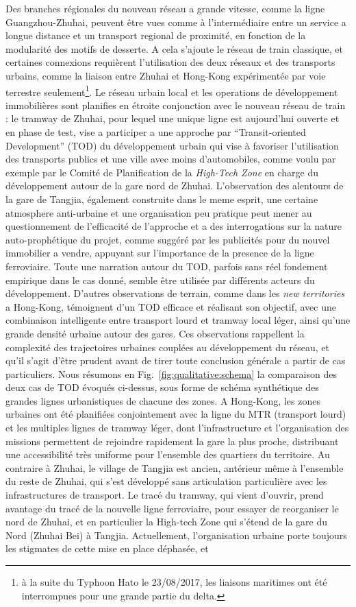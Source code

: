 {Des branches régionales du nouveau réseau a grande vitesse, comme la ligne Guangzhou-Zhuhai, peuvent être vues comme à l'intermédiaire entre un service a longue distance et un transport regional de proximité, en fonction de la modularité des motifs de desserte. A cela s'ajoute le réseau de train classique, et certaines connexions requièrent l'utilisation des deux réseaux et des transports urbains, comme la liaison entre Zhuhai et Hong-Kong expérimentée par voie terrestre seulement\footnote{à la suite du Typhoon Hato le 23/08/2017, les liaisons maritimes ont été interrompues pour une grande partie du delta.}. Le réseau urbain local et les operations de développement immobilières sont planifies en étroite conjonction avec le nouveau réseau de train : le tramway de Zhuhai, pour lequel une unique ligne est aujourd'hui ouverte et en phase de test, vise a participer a une approche par ``Transit-oriented Development'' (TOD) du développement urbain qui vise à favoriser l'utilisation des transports publics et une ville avec moins d'automobiles, comme voulu par exemple par le Comité de Planification de la \emph{High-Tech Zone} en charge du développement autour de la gare nord de Zhuhai. L'observation des alentours de la gare de Tangjia, également construite dans le meme esprit, une certaine atmosphere anti-urbaine et une organisation peu pratique peut mener au questionnement de l'efficacité de l'approche et a des interrogations sur la nature auto-prophétique du projet, comme suggéré par les publicités pour du nouvel immobilier a vendre, appuyant sur l'importance de la presence de la ligne ferroviaire. Toute une narration autour du TOD, parfois sans réel fondement empirique dans le cas donné, semble être utilisée par différents acteurs du développement. D'autres observations de terrain, comme dans les \emph{new territories} a Hong-Kong, témoignent d'un TOD efficace et réalisant son objectif, avec une combinaison intelligente entre transport lourd et tramway local léger, ainsi qu'une grande densité urbaine autour des gares. Ces observations rappellent la complexité des trajectoires urbaines couplées au développement du réseau, et qu'il s'agit d'être prudent avant de tirer toute conclusion générale a partir de cas particuliers. Nous résumons en Fig.~\ref{fig:qualitative:schema} la comparaison des deux cas de TOD évoqués ci-dessus, sous forme de schéma synthétique des grandes lignes urbanistiques de chacune des zones. A Hong-Kong, les zones urbaines ont été planifiées conjointement avec la ligne du MTR (transport lourd) et les multiples lignes de tramway léger, dont l'infrastructure et l'organisation des missions permettent de rejoindre rapidement la gare la plus proche, distribuant une accessibilité très uniforme pour l'ensemble des quartiers du territoire. Au contraire à Zhuhai, le village de Tangjia est ancien, antérieur même à l'ensemble du reste de Zhuhai, qui s'est développé sans articulation particulière avec les infrastructures de transport. Le tracé du tramway, qui vient d'ouvrir, prend avantage du tracé de la nouvelle ligne ferroviaire, pour essayer de reorganiser le nord de Zhuhai, et en particulier la High-tech Zone qui s'étend de la gare du Nord (Zhuhai Bei) à Tangjia. Actuellement, l'organisation urbaine porte toujours les stigmates de cette mise en place déphasée, et }
